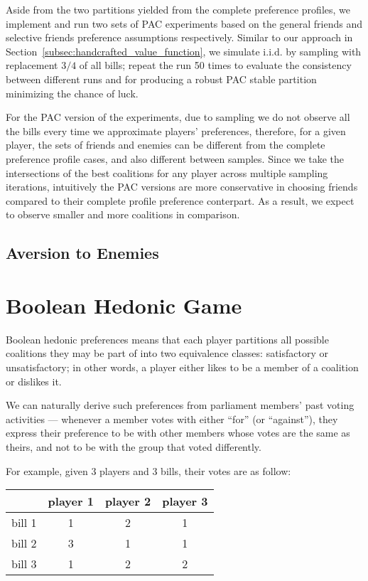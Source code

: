 Aside from the two partitions yielded from the complete preference profiles,
we implement and run two sets of PAC experiments based on the general friends
and selective friends preference assumptions respectively.
Similar to our approach in Section~\ref{subsec:handcrafted_value_function},
we simulate i.i.d. by sampling with replacement $3/4$ of all bills;
repeat the run 50 times to evaluate the consistency between different runs and
for producing a robust PAC stable partition minimizing the chance of luck.

For the PAC version of the experiments, due to sampling we do not observe all
the bills every time we approximate players' preferences,
therefore, for a given player, the sets of friends and enemies can be different
from the complete preference profile cases, and also different between samples.
Since we take the intersections of the best coalitions for any player across
multiple sampling iterations, intuitively the PAC versions are more conservative
in choosing friends compared to their complete profile preference conterpart.
As a result, we expect to observe smaller and more coalitions in comparison.


\subsection{Aversion to Enemies}
\label{subsec:aversion_to_enemies}

\section{Boolean Hedonic Game}
\label{sec:boolean_hedonic_game}

Boolean hedonic preferences means that each player partitions all possible
coalitions they may be part of into two equivalence classes:
satisfactory or unsatisfactory; in other words, a player either likes to be
a member of a coalition or dislikes it.

We can naturally derive such preferences from parliament members' past voting
activities --- whenever a member votes with either ``for'' (or ``against''), they
express their preference to be with other members whose votes are the same
as theirs, and not to be with the group that voted differently.

For example, given 3 players and 3 bills, their votes are as follow:

\begin{table}[h!]
\centering
\begin{tabular}{|c|c|c|c|}
\hline
       & player 1 & player 2 & player 3 \\ \hline
bill 1 & 1 & 2 & 1 \\
bill 2 & 3 & 1 & 1 \\
bill 3 & 1 & 2 & 2 \\
\hline
\end{tabular}
\end{table}

